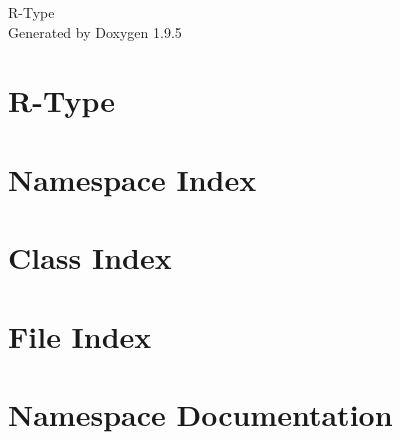 \documentclass[twoside]{book}
\newcommand{\+}{\discretionary{\mbox{\scriptsize$\hookleftarrow$}}{}{}}
\newcommand{\clearemptydoublepage}{%
    \newpage{\pagestyle{empty}\cleardoublepage}%
  }
\begin{document}
  \raggedbottom
    \hypersetup{pageanchor=false,
                bookmarksnumbered=true,
                pdfencoding=unicode
               }
  \begin{titlepage}
  \vspace*{7cm}
  \begin{center}%
  {\Large R-\/\+Type}\\
  \vspace*{1cm}
  {\large Generated by Doxygen 1.9.5}\\
  \end{center}
  \end{titlepage}
  \clearemptydoublepage
  \tableofcontents
  \clearemptydoublepage
  \hypersetup{pageanchor=true}
\chapter{R-\/\+Type}
\label{index}\hypertarget{index}{}
\chapter{Namespace Index}

\chapter{Class Index}

\chapter{File Index}

\chapter{Namespace Documentation}

\end{document}
